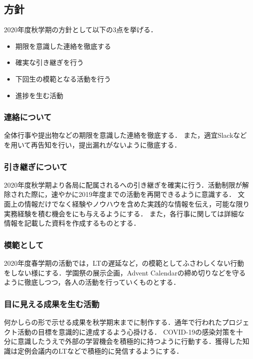 \subsection*{\secondGrade{}方針}


2020年度秋学期の\secondGrade{}方針として以下の3点を挙げる．

\begin{itemize}
    \item 期限を意識した連絡を徹底する
    \item 確実な引き継ぎを行う
    \item 下回生の模範となる活動を行う
    \item 進捗を生む活動
\end{itemize}

\subsubsection*{連絡について}
全体行事や提出物などの期限を意識した連絡を徹底する．
また，適宜Slackなどを用いて再告知を行い，提出漏れがないように徹底する．

\subsubsection*{引き継ぎについて}
2020年度秋学期より各局に配属される\firstGrade{}への引き継ぎを確実に行う．活動制限が解除された際に，速やかに2019年度までの活動を再開できるように意識する．
文面上の情報だけでなく経験やノウハウを含めた実践的な情報を伝え，可能な限り実務経験を積む機会を\firstGrade{}にも与えるようにする．
また，各行事に関しては詳細な情報を記載した資料を作成するものとする．

\subsubsection*{模範として}
2020年度春学期の活動では，LTの遅延など，\firstGrade{}の模範としてふさわしくない行動をしない様にする．学園祭の展示企画，Advent Calendarの締め切りなどを守るように徹底しつつ，各人の活動を行っていくものとする．

\subsubsection*{目に見える成果を生む活動}
何かしらの形で示せる成果を秋学期末までに制作する．通年で行われたプロジェクト活動の目標を意識的に達成するよう心掛ける．
COVID-19の感染対策を十分に意識したうえで外部の学習機会を積極的に持つように行動する．獲得した知識は定例会議内のLTなどで積極的に発信するようにする．
